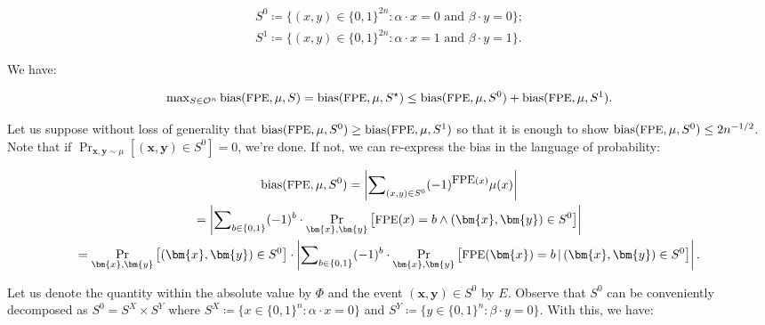 \documentclass[10pt,a4paper]{article}
\begin{document}
\[\begin{gathered}
\displaystyle S^{0} \displaystyle\coloneqq\{(x,y)\in\{0,1\}^{2n}:\alpha\cdot x=0\text{ and }\beta\cdot y=0\}; \\
\displaystyle S^{1} \displaystyle\coloneqq\{(x,y)\in\{0,1\}^{2n}:\alpha\cdot x=1\text{ and }\beta\cdot y=1\}.
\end{gathered}\]


We have:\par


\[\begin{gathered}
\max\nolimits_{S\in\mathcal{O}^{n}}{\textup{bias}}({\textrm{\small{FPE}}},\mu,S)={\textup{bias}}({\textrm{\small{FPE}}},\mu,S^{\star})\leq{\textup{bias}}({\textrm{\small{FPE}}},\mu,S^{0})+{\textup{bias}}({\textrm{\small{FPE}}},\mu,S^{1}).
\end{gathered}\]


Let us suppose without loss of generality that ${\textup{bias}}({\textrm{\small{FPE}}},\mu,S^{0})\geq{\textup{bias}}({\textrm{\small{FPE}}},\mu,S^{1})$ so that it is enough to show ${\textup{bias}}({\textrm{\small{FPE}}},\mu,S^{0})\leq 2n^{-1/2}$. Note that if $\Pr_{\bm{x},\bm{y}\sim\mu}[(\bm{x},\bm{y})\in S^{0}]=0$, we’re done. If not, we can re-express the bias in the language of probability:\par


\[\begin{gathered}
\displaystyle{\textup{bias}}({\textrm{\small{FPE}}},\mu,S^{0}) \displaystyle=\left|\sum\nolimits_{(x,y)\in S^{0}}(-1)^{{\textrm{\small{FPE}}}(x)}\mu(x)\right| \\
\displaystyle=\left|\sum\nolimits_{b\in\{0,1\}}(-1)^{b}\cdot\Pr_{\bm{x},\bm{y}}\left[{\textrm{\small{FPE}}}(x)=b\wedge(\bm{x},\bm{y})\in S^{0}\right]\right| \\
\displaystyle=\Pr_{\bm{x},\bm{y}}\left[(\bm{x},\bm{y})\in S^{0}\right]\cdot\left|\sum\nolimits_{b\in\{0,1\}}(-1)^{b}\cdot\Pr_{\bm{x},\bm{y}}\left[{\textrm{\small{FPE}}}(\bm{x})=b\,|\,(\bm{x},\bm{y})\in S^{0}\right]\right|.
\end{gathered}\]


Let us denote the quantity within the absolute value by $\Phi$ and the event $(\bm{x},\bm{y})\in S^{0}$ by $E$. Observe that $S^{0}$ can be conveniently decomposed as $S^{0}=S^{X}\times S^{Y}$ where $S^{X}\coloneqq\{x\in\{0,1\}^{n}:\alpha\cdot x=0\}$ and $S^{Y}\coloneqq\{y\in\{0,1\}^{n}:\beta\cdot y=0\}$. With this, we have:\par
\end{document}
